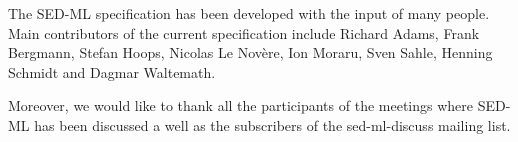 \label{sec:acknowledgments}
The SED-ML specification has been developed with the input of many people. Main contributors of the current specification include Richard Adams, Frank Bergmann, Stefan Hoops, Nicolas Le Nov\`ere, Ion Moraru, Sven Sahle, Henning Schmidt and  Dagmar Waltemath.

Moreover, we would like to thank all the participants of the meetings where SED-ML has been discussed a well as the subscribers of the sed-ml-discuss mailing list.

